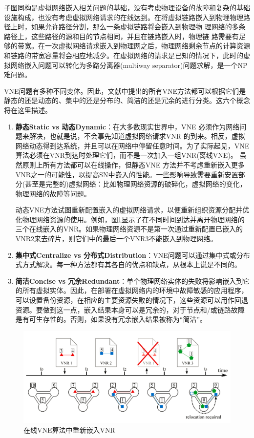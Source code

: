 子图同构是虚拟网络嵌入相关问题的基础\cite{lischka2009virtual}，没有考虑物理设备的故障和复杂的基础设施构成，也没有考虑虚拟网络请求的在线达到。在将虚拟链路嵌入到物理物理路径上时，如果允许路径分割，那么一条虚拟链路将会嵌入到物理物 理网络的多条路径上，这些路径的源和目的节点相同，并且在链路嵌入时，物理链 路需要有足够的带宽\cite{yu2008rethinking}。在一次虚拟网络请求嵌入到物理网之后，物理网络剩余节点的计算资源和链路的带宽容量将会相应地减少。在虚拟网络的请求是已知的情况下，此时的虚拟网络嵌入问题可以转化为多路分离器(multiway separator)问题求解，是一个NP难问题\cite{andersen2002theoretical}。

VNE问题有多种不同变体。因此，文献中提出的所有VNE方法都可以根据它们是静态的还是动态的、集中的还是分布的、简洁的还是冗余的进行分类。这六个概念将在这里描述。
\begin{enumerate}
  \item \textbf{静态Static vs 动态Dynamic}：在大多数现实世界中，VNE 必须作为网络问题来解决，也就是说，不会事先知道虚拟网络请求VNR 的到来。相反，虚拟网络动态得到达系统，并且可以在网络中停留任意时间。为了实际起见，VNE算法必须在VNR到达时处理它们，而不是一次加入一组VNR(离线VNE)。 虽然原则上所有方法都可以在线操作，但静态VNE 方法并不考虑重新嵌入更多VNR之一的可能性，以提高SN中嵌入的性能。一些影响导致需要重新安置部分(甚至是完整的)虚拟网络：比如物理网络资源的破碎化，虚拟网络的变化，物理网络的故障等问题。

      动态VNE方法试图重新配置嵌入的虚拟网络请求，以便重新组织资源分配并优化物理网络资源的使用。例如，图\ref{fig:RelocationMappedVNRsOnlineVNE}显示了在不同时间到达并离开物理网络的三个在线嵌入的VNR。如果物理网络资源不是第一次通过重新配置已嵌入的VNR2来去碎片，则它们中的最后一个VNR3不能嵌入到物理网络。


  \item \textbf{集中式Centralize vs 分布式Distribution}：VNE问题可以通过集中式或分布式方式解决。每一种方法都有其各自的优点和缺点，从根本上说是不同的。
  \item \textbf{简洁Concise vs 冗余Redundant}：单个物理网络实体的失败将影响嵌入到它的所有虚拟实体。因此，在部署在虚拟网络内的环境中故障敏感的应用程序，可以设置备份资源，在相应的主要资源失败的情况下，这些资源可以用作回退资源。要做到这一点，嵌入结果本身可以是冗余的，对于节点和/或链路故障是有可生存性的。否则，如果没有冗余嵌入结果被称为“简洁”。
\end{enumerate}

\begin{figure}[htbp]
\centering
\includegraphics[width=5.0in]{figures/RelocationMappedVNRsOnlineVNE}
  \caption{在线VNE算法中重新嵌入VNR}
  \label{fig:RelocationMappedVNRsOnlineVNE}
\end{figure}

